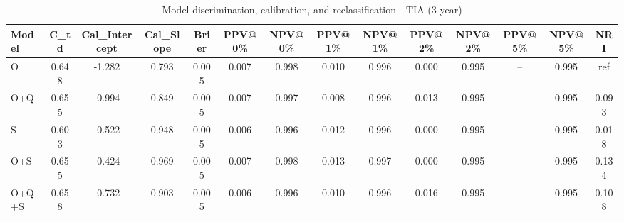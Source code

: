 \begin{table}[htbp]
\centering
\small
\caption{Model discrimination, calibration, and reclassification - TIA (3-year)}
\label{tab:perf_tia_3y}
\begin{tabular}{lccccccccccccc}
\toprule
Model & C\_td & Cal\_Intercept & Cal\_Slope & Brier & PPV@0\% & NPV@0\% & PPV@1\% & NPV@1\% & PPV@2\% & NPV@2\% & PPV@5\% & NPV@5\% & NRI \\
\midrule
O & 0.648 & -1.282 & 0.793 & 0.005 & 0.007 & 0.998 & 0.010 & 0.996 & 0.000 & 0.995 & -- & 0.995 & ref \\
O+Q & 0.655 & -0.994 & 0.849 & 0.005 & 0.007 & 0.997 & 0.008 & 0.996 & 0.013 & 0.995 & -- & 0.995 & 0.093 \\
S & 0.603 & -0.522 & 0.948 & 0.005 & 0.006 & 0.996 & 0.012 & 0.996 & 0.000 & 0.995 & -- & 0.995 & 0.018 \\
O+S & 0.655 & -0.424 & 0.969 & 0.005 & 0.007 & 0.998 & 0.013 & 0.997 & 0.000 & 0.995 & -- & 0.995 & 0.134 \\
O+Q+S & 0.658 & -0.732 & 0.903 & 0.005 & 0.006 & 0.996 & 0.010 & 0.996 & 0.016 & 0.995 & -- & 0.995 & 0.108 \\
\bottomrule
\end{tabular}
\end{table}